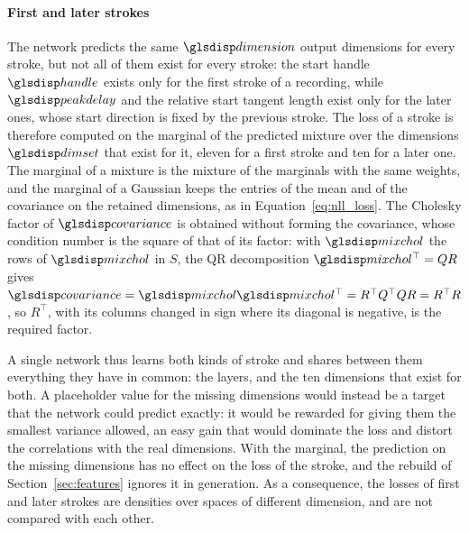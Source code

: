 \documentclass[12pt]{report}
\begin{document}
\paragraph{First and later strokes}
The network predicts the same $\sym{dimension}$ output dimensions for every stroke, but not all of them exist for every stroke: the start handle $\sym{handle}_{s,0}$ exists only for the first stroke of a recording, while $\sym{peakdelay}_i$ and the relative start tangent length exist only for the later ones, whose start direction is fixed by the previous stroke. The loss of a stroke is therefore computed on the marginal of the predicted mixture over the dimensions $\sym{dimset}_i$ that exist for it, eleven for a first stroke and ten for a later one. The marginal of a mixture is the mixture of the marginals with the same weights, and the marginal of a Gaussian keeps the entries of the mean and of the covariance on the retained dimensions, as in Equation~\eqref{eq:nll_loss}. The Cholesky factor of $\sym{covariance}_{k,SS}$ is obtained without forming the covariance, whose condition number is the square of that of its factor: with $\sym{mixchol}_{k,S}$ the rows of $\sym{mixchol}_k$ in $S$, the QR decomposition $\sym{mixchol}_{k,S}^\top=QR$ gives $\sym{covariance}_{k,SS}=\sym{mixchol}_{k,S}\sym{mixchol}_{k,S}^\top=R^\top Q^\top QR=R^\top R$, so $R^\top$, with its columns changed in sign where its diagonal is negative, is the required factor.

A single network thus learns both kinds of stroke and shares between them everything they have in common: the layers, and the ten dimensions that exist for both. A placeholder value for the missing dimensions would instead be a target that the network could predict exactly: it would be rewarded for giving them the smallest variance allowed, an easy gain that would dominate the loss and distort the correlations with the real dimensions. With the marginal, the prediction on the missing dimensions has no effect on the loss of the stroke, and the rebuild of Section~\ref{sec:features} ignores it in generation. As a consequence, the losses of first and later strokes are densities over spaces of different dimension, and are not compared with each other.
\end{document}
